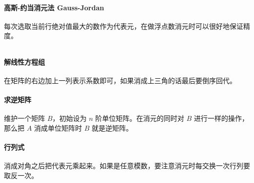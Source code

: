 \paragraph{高斯-约当消元法 Gauss-Jordan}
每次选取当前行绝对值最大的数作为代表元，在做浮点数消元时可以很好地保证精度。

\inputminted{cpp}{../src/math/gauss_jordan.cpp}

\paragraph{解线性方程组}
在矩阵的右边加上一列表示系数即可，如果消成上三角的话最后要倒序回代。

\paragraph{求逆矩阵}
维护一个矩阵 $B$，初始设为 $n$ 阶单位矩阵。在消元的同时对 $B$ 进行一样的操作，那么把 $A$ 消成单位矩阵时 $B$ 就是逆矩阵。

\paragraph{行列式}
消成对角之后把代表元乘起来。如果是任意模数，要注意消元时每交换一次行列要取反一次。
